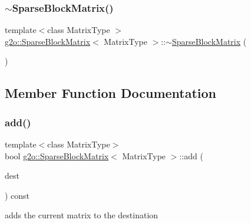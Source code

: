 \mbox{\label{classg2o_1_1_sparse_block_matrix_a70d18ec0265a69e1291083e20a5bc95e}} 
\subsubsection{\texorpdfstring{$\sim$\+Sparse\+Block\+Matrix()}{~SparseBlockMatrix()}}
{\footnotesize\ttfamily template$<$class Matrix\+Type $>$ \\
\mbox{\hyperlink{classg2o_1_1_sparse_block_matrix}{g2o\+::\+Sparse\+Block\+Matrix}}$<$ Matrix\+Type $>$\+::$\sim$\mbox{\hyperlink{classg2o_1_1_sparse_block_matrix}{Sparse\+Block\+Matrix}} (\begin{DoxyParamCaption}{ }\end{DoxyParamCaption})}



\subsection{Member Function Documentation}
\mbox{\label{classg2o_1_1_sparse_block_matrix_ae873eb42e1b3fbbe44d3cee48959c09a}} 
\subsubsection{\texorpdfstring{add()}{add()}}
{\footnotesize\ttfamily template$<$class Matrix\+Type$>$ \\
bool \mbox{\hyperlink{classg2o_1_1_sparse_block_matrix}{g2o\+::\+Sparse\+Block\+Matrix}}$<$ Matrix\+Type $>$\+::add (\begin{DoxyParamCaption}\item[{\mbox{\hyperlink{classg2o_1_1_sparse_block_matrix}{Sparse\+Block\+Matrix}}$<$ Matrix\+Type $>$ $\ast$\&}]{dest }\end{DoxyParamCaption}) const}



adds the current matrix to the destination 

\mbox{\label{classg2o_1_1_sparse_block_matrix_aaca7b38d2e9a18eebf9e6f5957af0cf7}} 
